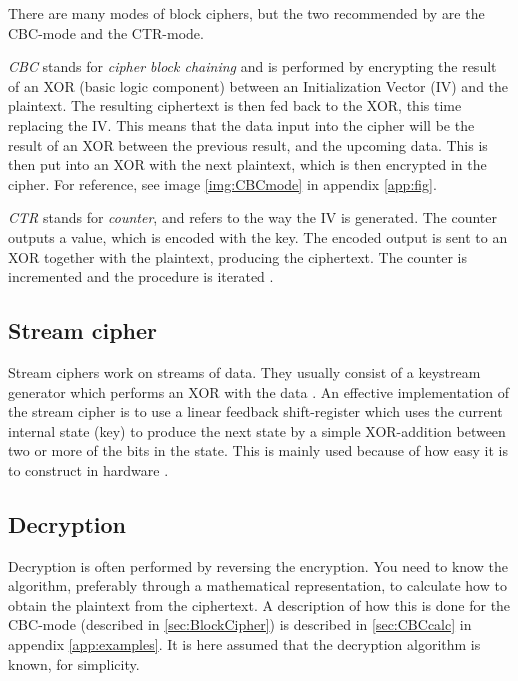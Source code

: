 There are many modes of block ciphers, but the two recommended by 
\citet{Schneier:2003} are the CBC-mode and the CTR-mode.

\emph{CBC} stands for \emph{cipher block chaining} and is performed by 
encrypting the result of an XOR (basic logic component) between 
an Initialization Vector (IV) and the plaintext. The resulting 
ciphertext is then fed back to the XOR, this time replacing the IV.
This means that the data input into the cipher will be the result of 
an XOR between the previous result, and the upcoming data. This is 
then put into an XOR with the next plaintext, which is then encrypted 
in the cipher. For reference, see image \ref{img:CBCmode} in 
appendix \ref{app:fig}. \citep[pp. 109--111]{Stinson:2006}

\emph{CTR} stands for \emph{counter}, and refers to the way the IV is 
generated. The counter outputs a value, which is encoded with the key. 
The encoded output is sent to an XOR together with the plaintext, 
producing the ciphertext. The counter is incremented and the procedure 
is iterated \citep[p. 111]{Stinson:2006}.

\subsection{Stream cipher} \label{sec:StreamCipher}
Stream ciphers work on streams of data. They usually consist of a 
keystream generator which performs an XOR with the data 
\cite[pp. 67]{Simmons:1992}. An effective implementation of the stream 
cipher is to use a linear feedback shift-register which uses the 
current internal state (key) to produce the next state by a simple 
XOR-addition between two or more of the bits in the state. This is 
mainly used because of how easy it is to construct in hardware 
\citep{LFSR:2008}.

\subsection{Decryption}
Decryption is often performed by reversing the encryption. You need to 
know the algorithm, preferably through a mathematical representation, 
to calculate how to obtain the plaintext from the ciphertext. A 
description of how this is done for the CBC-mode (described in 
\ref{sec:BlockCipher}) is described in \ref{sec:CBCcalc} in appendix 
\ref{app:examples}. It is here assumed that the decryption algorithm 
is known, for simplicity. 

